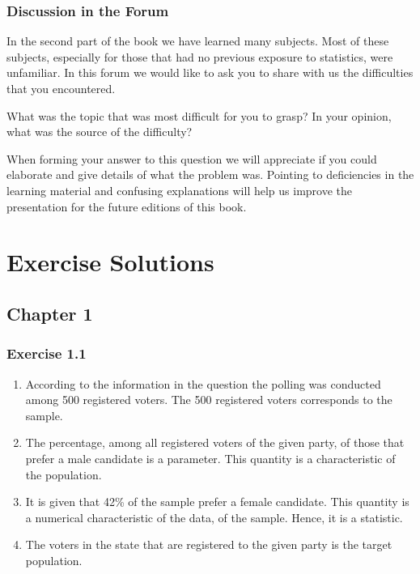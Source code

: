 \documentclass[]{krantz}
\theoremstyle{definition}
\theoremstyle{definition}
\theoremstyle{definition}
\theoremstyle{remark}
\begin{document}
\hypertarget{discussion-in-the-forum-1}{%
\subsection{Discussion in the Forum}\label{discussion-in-the-forum-1}}

In the second part of the book we have learned many subjects. Most of
these subjects, especially for those that had no previous exposure to
statistics, were unfamiliar. In this forum we would like to ask you to
share with us the difficulties that you encountered.

What was the topic that was most difficult for you to grasp? In your
opinion, what was the source of the difficulty?

When forming your answer to this question we will appreciate if you
could elaborate and give details of what the problem was. Pointing to
deficiencies in the learning material and confusing explanations will
help us improve the presentation for the future editions of this book.

\hypertarget{exercise-solutions}{%
\chapter*{Exercise Solutions}\label{exercise-solutions}}


\hypertarget{chapter-1}{%
\section*{Chapter 1}\label{chapter-1}}


\hypertarget{exercise-1.1}{%
\subsection*{Exercise 1.1}\label{exercise-1.1}}


\begin{enumerate}
\def\labelenumi{\arabic{enumi}.}
\item
  According to the information in the
  question the polling was conducted among 500 registered voters. The 500
  registered voters corresponds to the sample.
\item
  The percentage, among all registered
  voters of the given party, of those that prefer a male candidate is a
  parameter. This quantity is a characteristic of the population.
\item
  It is given that 42\% of the sample
  prefer a female candidate. This quantity is a numerical characteristic
  of the data, of the sample. Hence, it is a statistic.
\item
  The voters in the state that are
  registered to the given party is the target population.
\end{enumerate}
\end{document}
